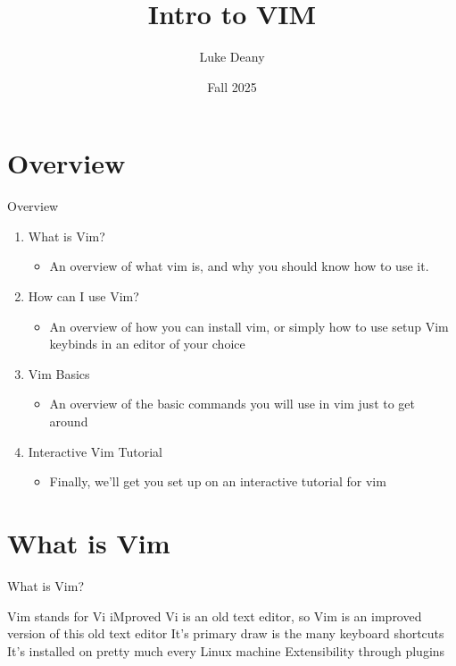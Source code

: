 \documentclass[12pt]{beamer}
\title{Intro to VIM}
\author{Luke Deany}
\institute{Linux Users Group @ UIC}
\date{Fall 2025}
\begin{document}
\maketitle

\section{Overview}

\begin{frame}{Overview}
\begin{enumerate}
    \item What is Vim?
        \begin{itemize}
            \item An overview of what vim is, and why you should know how to use it.
        \end{itemize}

    \item How can I use Vim?
        \begin{itemize}
            \item An overview of how you can install vim, or simply how to use setup Vim keybinds in an editor of your choice
        \end{itemize}

    \item Vim Basics
        \begin{itemize}
            \item An overview of the basic commands you will use in vim just to get around
        \end{itemize}

    \item Interactive Vim Tutorial
        \begin{itemize}
            \item Finally, we’ll get you set up on an interactive tutorial for vim
        \end{itemize}
\end{enumerate}    
\end{frame}

\section{What is Vim}
\begin{frame}{What is Vim?}
\begin{outline}
\1 Vim stands for Vi iMproved
\2 Vi is an old text editor, so Vim is an improved version of this old text editor
\1 It’s primary draw is the many keyboard shortcuts
\1 It’s installed on pretty much every Linux machine
\1 Extensibility through plugins

\end{outline}
\end{frame}
\end{document}
